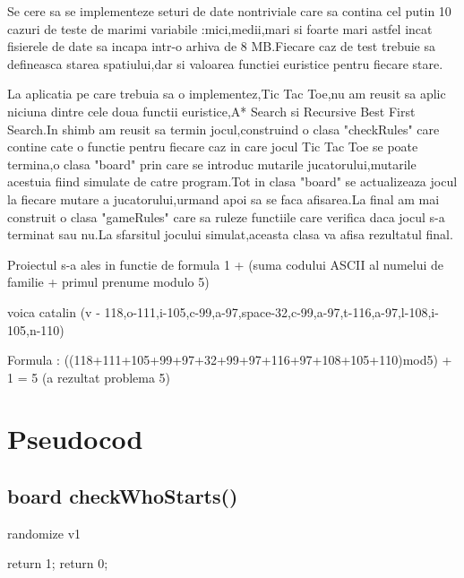 \documentclass[12]{article}
\begin{document}
Se cere sa se implementeze seturi de date nontriviale care sa contina cel putin 10 cazuri de teste de marimi variabile :mici,medii,mari si foarte mari astfel incat fisierele de date sa incapa intr-o arhiva de 8 MB.Fiecare caz de test trebuie sa defineasca starea spatiului,dar si valoarea functiei euristice pentru fiecare stare.
\newline
\newline 

La aplicatia pe care trebuia sa o implementez,Tic Tac Toe,nu am reusit sa aplic niciuna dintre cele doua functii euristice,A* Search si Recursive Best First Search.In shimb am reusit sa termin jocul,construind o clasa "checkRules" care contine cate o functie pentru fiecare caz in care jocul Tic Tac Toe se poate termina,o clasa "board"  prin care se introduc mutarile jucatorului,mutarile acestuia fiind simulate de catre program.Tot in clasa "board" se actualizeaza jocul la fiecare mutare a jucatorului,urmand apoi sa se faca afisarea.La final am mai construit o clasa "gameRules" care sa ruleze functiile care verifica daca jocul s-a terminat sau nu.La sfarsitul jocului simulat,aceasta clasa va afisa rezultatul final.

Proiectul s-a ales in functie de formula 1 + (suma codului ASCII al numelui de familie + primul prenume modulo 5)

voica catalin (v - 118,o-111,i-105,c-99,a-97,space-32,c-99,a-97,t-116,a-97,l-108,i-105,n-110)

Formula : ((118+111+105+99+97+32+99+97+116+97+108+105+110)mod5) + 1 = 5 (a rezultat problema 5)



\newpage
\section{Pseudocod}

\subsection{board checkWhoStarts()}
\begin{algorithmic}[1]
\STATE randomize v1

	\STATE return 1;
\ENDIF
	\STATE return 0;

\end{algorithmic}
\end{document}
